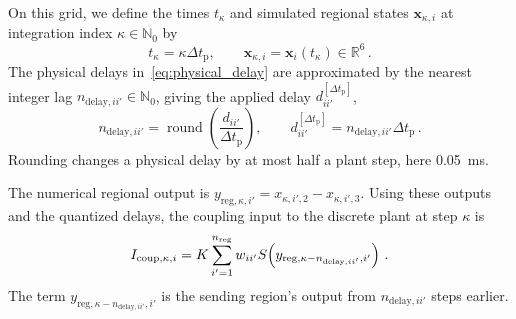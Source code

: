 On this grid, we define the times $t_\kappa$ and simulated regional states $\mathbf{x}_{\kappa,i}$ at integration index $\kappa\in\mathbb{N}_0$ by
%
\begin{equation}
    t_\kappa=\kappa\Delta t_\mathrm{p},
    \qquad \mathbf{x}_{\kappa,i}=\mathbf{x}_i(t_\kappa)\in\mathbb{R}^{6}\,.
\end{equation}
%
The physical delays in~\eqref{eq:physical_delay} are approximated by the nearest integer lag $n_{\mathrm{delay},ii'}\in\mathbb{N}_0$, giving the applied delay $d_{ii'}^{[\Delta t_\mathrm{p}]}$,
%
\begin{equation*}
    n_{\mathrm{delay},ii'}=\operatorname{round}\!\left(\frac{d_{ii'}}{\Delta t_\mathrm{p}}\right),
    \qquad
    d_{ii'}^{[\Delta t_\mathrm{p}]}=n_{\mathrm{delay},ii'}\Delta t_\mathrm{p}\,.
\end{equation*}
%
Rounding changes a physical delay by at most half a plant step, here \SI{0.05}{\milli\second}.

The numerical regional output is \mbox{$y_{\mathrm{reg},\kappa,i'}=x_{\kappa,i',2}-x_{\kappa,i',3}$}.
Using these outputs and the quantized delays, the coupling input to the discrete plant at step $\kappa$ is
%
\begin{equation*}
    I_{\mathrm{coup},\kappa,i}
    =K\sum_{i'=1}^{n_{\mathrm{reg}}{}}w_{ii'}
      S\!\left(y_{\mathrm{reg},\kappa-n_{\mathrm{delay},ii'},i'}\right)\,.
\end{equation*}
%
The term $y_{\mathrm{reg},\kappa-n_{\mathrm{delay},ii'},i'}$ is the sending region's output from $n_{\mathrm{delay},ii'}$ steps earlier.

